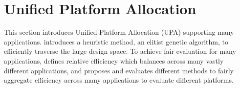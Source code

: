 \vspace{-2pt}
\section{Unified Platform Allocation}
\label{sec:eval}

This section introduces Unified Platform Allocation (UPA) supporting many applications.  introduces a heuristic method, an elitist genetic algorithm, to efficiently traverse the large design space. To achieve fair evaluation for many applications,  defines relative efficiency which balances across many vastly different applications, and  proposes and evaluates different methods to fairly aggregate efficiency across many applications to evaluate different platforms.




















